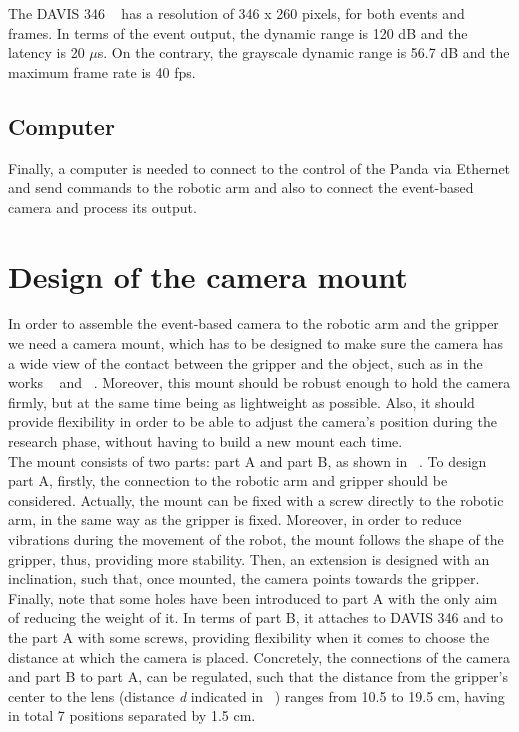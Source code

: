 The DAVIS 346 ~\cite{davis} has a resolution of 346 x 260 pixels, for both events and frames. In terms of the event output, the dynamic range is 120 dB and the latency is 20 $\mu$s. On the contrary, the grayscale dynamic range is 56.7 dB and the maximum frame rate is 40 fps.

\subsection{Computer}

Finally, a computer is needed to connect to the control of the Panda via Ethernet and send commands to the robotic arm and also to connect the event-based camera and process its output.

\section{Design of the camera mount}

In order to assemble the event-based camera to the robotic arm and the gripper we need a camera mount, which has to be designed to make sure the camera has a wide view of the contact between the gripper and the object, such as in the works ~\cite{gelsight2018} and ~\cite{rss2020}. Moreover, this mount should be robust enough to hold the camera firmly, but at the same time being as lightweight as possible. Also, it should provide flexibility in order to be able to adjust the camera's position during the research phase, without having to build a new mount each time.\\

The mount consists of two parts: part A and part B, as shown in ~. To design part A, firstly, the connection to the robotic arm and gripper should be considered. Actually, the mount can be fixed with a screw directly to the robotic arm, in the same way as the gripper is fixed. Moreover, in order to reduce vibrations during the movement of the robot, the mount follows the shape of the gripper, thus, providing more stability. Then, an extension is designed with an inclination, such that, once mounted, the camera points towards the gripper. Finally, note that some holes have been introduced to part A with the only aim of reducing the weight of it. In terms of part B, it attaches to DAVIS 346 and to the part A with some screws, providing flexibility when it comes to choose the distance at which the camera is placed. Concretely, the connections of the camera and part B to part A, can be regulated, such that the distance from the gripper's center to the lens (distance \textit{d} indicated in ~) ranges from 10.5 to 19.5 cm, having in total 7 positions separated by 1.5 cm.

